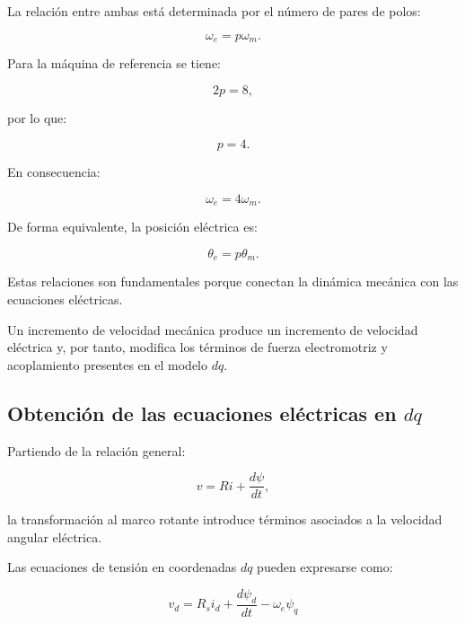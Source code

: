 La relación entre ambas está determinada por el número de pares de polos:

\begin{equation}
\omega_e=p\omega_m.
\end{equation}

Para la máquina de referencia se tiene:

\begin{equation}
2p=8,
\end{equation}

por lo que:

\begin{equation}
p=4.
\end{equation}

En consecuencia:

\begin{equation}
\omega_e=4\omega_m.
\end{equation}

De forma equivalente, la posición eléctrica es:

\begin{equation}
\theta_e=p\theta_m.
\end{equation}

Estas relaciones son fundamentales porque conectan la dinámica mecánica con las ecuaciones eléctricas.

Un incremento de velocidad mecánica produce un incremento de velocidad eléctrica y, por tanto, modifica los términos de fuerza electromotriz y acoplamiento presentes en el modelo $dq$.

\subsection{\texorpdfstring{Obtención de las ecuaciones eléctricas en $dq$}{Obtención de las ecuaciones eléctricas en dq}}

Partiendo de la relación general:

\begin{equation}
v=Ri+\frac{d\psi}{dt},
\end{equation}

la transformación al marco rotante introduce términos asociados a la velocidad angular eléctrica.

Las ecuaciones de tensión en coordenadas $dq$ pueden expresarse como:

\begin{equation}
v_d
=
R_si_d
+
\frac{d\psi_d}{dt}
-
\omega_e\psi_q
\end{equation}

